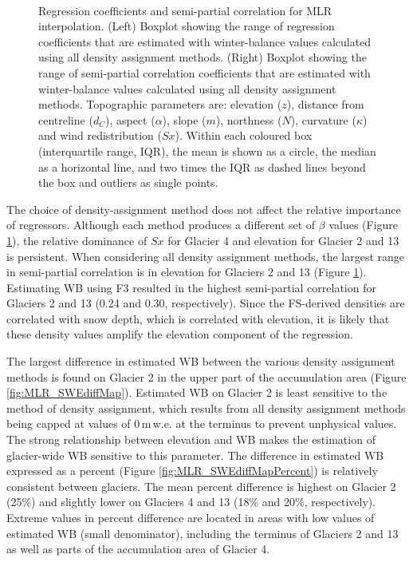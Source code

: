 \documentclass{sfuthesis}
\newcommand{\params}{Topographic parameters are: elevation ($z$), distance from centreline ($d_C$), aspect ($\alpha$), slope ($m$), northness ($N$), curvature ($\kappa$) and wind redistribution ($Sx$). }
\newcommand{\boxplot}{Within each coloured box (interquartile range, IQR), the mean is shown as a circle, the median as a horizontal line, and two times the IQR as dashed lines beyond the box and outliers as single points. }
\begin{document}
\begin{figure}[H]
	\centering
	 \\
	\caption[Regression coefficients and semi-partial correlation for MLR interpolation]{Regression coefficients and semi-partial correlation for MLR interpolation. (Left) Boxplot showing the range of regression coefficients that are estimated with winter-balance values calculated using all density assignment methods. (Right) Boxplot showing the range of semi-partial correlation coefficients that are estimated with winter-balance values calculated using all density assignment methods. \params \boxplot }
	\label{fig:MLRsemiR2_densityOptions}
\end{figure} 

The choice of density-assignment method does not affect the relative importance of regressors. Although each method produces a different set of $\beta$ values (Figure \ref{fig:MLRsemiR2_densityOptions}), the relative dominance of $Sx$ for Glacier 4 and elevation for Glacier 2 and 13 is persistent. When considering all density assignment methods, the largest range in semi-partial correlation is in elevation for Glaciers 2 and 13 (Figure \ref{fig:MLRsemiR2_densityOptions}). Estimating WB using F3 resulted in the highest semi-partial correlation for Glaciers 2 and 13 (0.24 and 0.30, respectively). Since the FS-derived densities are correlated with snow depth, which is correlated with elevation, it is likely that these density values amplify the elevation component of the regression. 

The largest difference in estimated WB between the various density assignment methods is found on Glacier 2 in the upper part of the accumulation area (Figure \ref{fig:MLR_SWEdiffMap}). Estimated WB on Glacier 2 is least sensitive to the method of density assignment, which results from all density assignment methods being capped at values of 0\,m\,w.e. at the terminus to prevent unphysical values. The strong relationship between elevation and WB makes the estimation of glacier-wide WB sensitive to this parameter. The difference in estimated WB expressed as a percent (Figure \ref{fig:MLR_SWEdiffMapPercent}) is relatively consistent between glaciers. The mean percent difference is highest on Glacier 2 (25\%) and slightly lower on Glaciers 4 and 13 (18\% and 20\%, respectively). Extreme values in percent difference are located in areas with low values of estimated WB (small denominator), including the terminus of Glaciers 2 and 13 as well as parts of the accumulation area of Glacier 4.  
\end{document}
